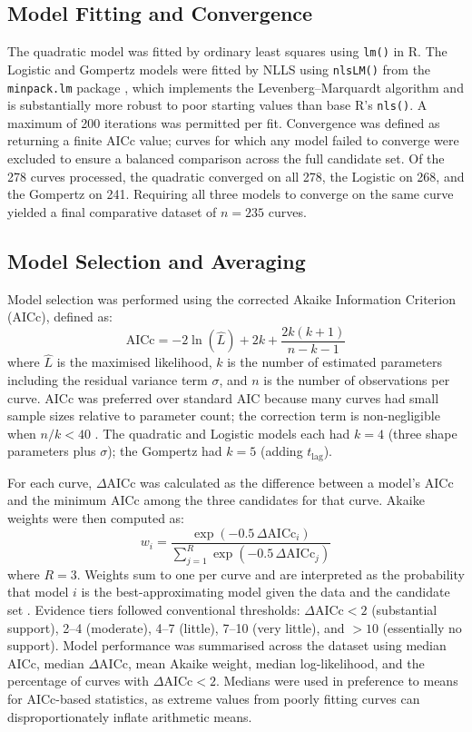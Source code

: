 \documentclass[11pt,a4paper]{article}
\begin{document}
\subsection{Model Fitting and Convergence}

The quadratic model was fitted by ordinary least squares using
\texttt{lm()} in R. The Logistic and Gompertz models were fitted by NLLS
using \texttt{nlsLM()} from the \texttt{minpack.lm} package
\citep{minpacklm}, which implements the Levenberg--Marquardt algorithm
and is substantially more robust to poor starting values than base R's
\texttt{nls()}. A maximum of 200 iterations was permitted per fit.
Convergence was defined as returning a finite AICc value; curves for
which any model failed to converge were excluded to ensure a balanced
comparison across the full candidate set. Of the 278 curves processed,
the quadratic converged on all 278, the Logistic on 268, and the
Gompertz on 241. Requiring all three models to converge on the same
curve yielded a final comparative dataset of $n = 235$ curves.

\subsection{Model Selection and Averaging}

Model selection was performed using the corrected Akaike Information
Criterion (AICc), defined as:
\begin{equation}
    \text{AICc} = -2\ln(\hat{L}) + 2k + \frac{2k(k+1)}{n - k - 1}
\end{equation}
where $\hat{L}$ is the maximised likelihood, $k$ is the number of
estimated parameters including the residual variance term $\sigma$, and
$n$ is the number of observations per curve. AICc was preferred over
standard AIC because many curves had small sample sizes relative to
parameter count; the correction term is non-negligible when $n/k < 40$
\citep{burnham2002}. The quadratic and Logistic models each had $k = 4$
(three shape parameters plus $\sigma$); the Gompertz had $k = 5$
(adding $t_{\text{lag}}$).

For each curve, $\Delta\text{AICc}$ was calculated as the difference
between a model's AICc and the minimum AICc among the three candidates
for that curve. Akaike weights were then computed as:
\begin{equation}
    w_i = \frac{\exp(-0.5\,\Delta\text{AICc}_i)}
               {\displaystyle\sum_{j=1}^{R} \exp(-0.5\,\Delta\text{AICc}_j)}
\end{equation}
where $R = 3$. Weights sum to one per curve and are interpreted as the
probability that model $i$ is the best-approximating model given the
data and the candidate set \citep{burnham2002}. Evidence tiers followed
conventional thresholds: $\Delta\text{AICc} < 2$ (substantial support),
2--4 (moderate), 4--7 (little), 7--10 (very little), and $> 10$
(essentially no support). Model performance was summarised across the
dataset using median AICc, median $\Delta\text{AICc}$, mean Akaike
weight, median log-likelihood, and the percentage of curves with
$\Delta\text{AICc} < 2$. Medians were used in preference to means for
AICc-based statistics, as extreme values from poorly fitting curves can
disproportionately inflate arithmetic means.
\end{document}
